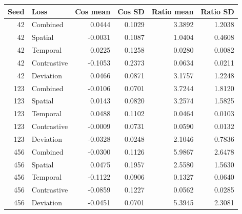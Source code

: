 \begingroup\color{revisionblue}
\sffamily\fontsize{9}{11}\selectfont\renewcommand{\arraystretch}{1.08}\setlength{\tabcolsep}{3pt}
\begin{tabular}{rlrrrr}

\toprule
Seed & Loss & Cos mean & Cos SD & Ratio mean & Ratio SD \\
\midrule

42 & Combined & 0.0444 & 0.1029 & 3.3892 & 1.2038 \\

42 & Spatial & -0.0031 & 0.1087 & 1.0404 & 0.4608 \\

42 & Temporal & 0.0225 & 0.1258 & 0.0280 & 0.0082 \\

42 & Contrastive & -0.1053 & 0.2373 & 0.0634 & 0.0211 \\

42 & Deviation & 0.0466 & 0.0871 & 3.1757 & 1.2248 \\

123 & Combined & -0.0106 & 0.0701 & 3.7244 & 1.8120 \\

123 & Spatial & 0.0143 & 0.0820 & 3.2574 & 1.5825 \\

123 & Temporal & 0.0488 & 0.1102 & 0.0464 & 0.0103 \\

123 & Contrastive & -0.0009 & 0.0731 & 0.0590 & 0.0132 \\

123 & Deviation & -0.0328 & 0.0248 & 2.1046 & 0.7836 \\

456 & Combined & -0.0300 & 0.1126 & 5.9867 & 2.6478 \\

456 & Spatial & 0.0475 & 0.1957 & 2.5580 & 1.5630 \\

456 & Temporal & -0.1122 & 0.0906 & 0.1327 & 0.0640 \\

456 & Contrastive & -0.0859 & 0.1227 & 0.0562 & 0.0285 \\

456 & Deviation & -0.0451 & 0.0701 & 5.3945 & 2.3081 \\

\bottomrule
\end{tabular}
\endgroup

